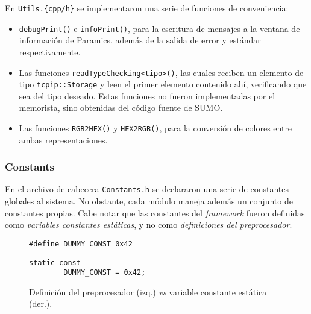 En \texttt{Utils.\{cpp/h\}} se implementaron una serie de funciones de conveniencia:
\begin{itemize}
    \item \texttt{debugPrint()} e \texttt{infoPrint()}, para la escritura de mensajes a la ventana de información de Paramics, además de la salida de error y estándar respectivamente. 
    
    \item Las funciones \texttt{readTypeChecking<tipo>()}, las cuales reciben un elemento de tipo \texttt{tcpip::Storage} y leen el primer elemento contenido ahí, verificando que sea del tipo deseado. Estas funciones no fueron implementadas por el memorista, sino obtenidas del código fuente de SUMO.
    
    \item Las funciones \texttt{RGB2HEX()} y \texttt{HEX2RGB()}, para la conversión de colores entre ambas representaciones.
\end{itemize}

\subsubsection{Constants}

En el archivo de cabecera \texttt{Constants.h} se declararon una serie de constantes globales al sistema. No obstante, cada módulo maneja además un conjunto de constantes propias. Cabe notar que las constantes del \emph{framework} fueron definidas como \emph{variables constantes estáticas}, y no como \emph{definiciones del preprocesador}.

\begin{figure}[h]
    \centering
    \begin{minipage}{.49\linewidth}
        \begin{lstlisting}[style=CPP, numbers=none, frame=none, backgroundcolor=\color{white}]
        #define DUMMY_CONST 0x42
        \end{lstlisting}
    \end{minipage}
    \begin{minipage}{.49\linewidth}
        \begin{lstlisting}[style=CPP, numbers=none, frame=l, backgroundcolor=\color{white}]
        static const
        DUMMY_CONST = 0x42;
        \end{lstlisting}
    \end{minipage}
    \caption[Definición del preprocesador vs. variable constante estática]{Definición del preprocesador (izq.) \emph{vs} variable constante estática (der.).}
\end{figure}

